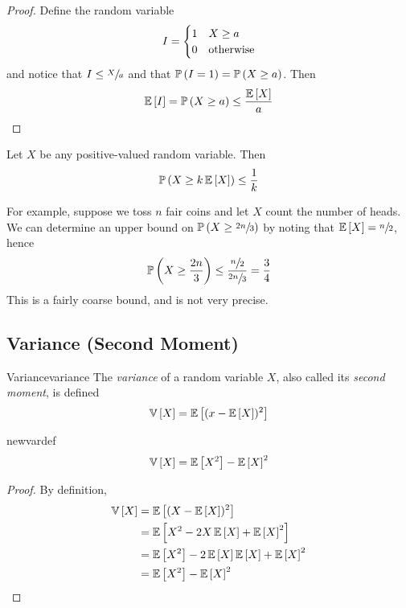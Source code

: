 \begin{proof}
    Define the random variable
    \[I = \begin{cases}
        1 & X \geq a\\
        0 & \hbox{otherwise}
    \end{cases}\]
    and notice that $I \leq \sfrac{X}{a}$ and that $\operatorname{\mathbb{P}}\left(I = 1\right) = \operatorname{\mathbb{P}}\left(X \geq
    a\right)$. Then
    \[\operatorname{\mathbb{E}}\left[I\right] = \operatorname{\mathbb{P}}\left(X \geq a\right) \leq \frac{\operatorname{\mathbb{E}}\left[X\right]}{a}\qedhere\]
\end{proof}

\begin{corollary}{}{}
    Let $X$ be any positive-valued random variable. Then
    \[\operatorname{\mathbb{P}}\left(X \geq k\operatorname{\mathbb{E}}\left[X\right]\right) \leq \frac{1}{k}\]
\end{corollary}

For example, suppose we toss $n$ fair coins and let $X$ count the number of
heads. We can determine an upper bound on $\operatorname{\mathbb{P}}\left(X \geq \sfrac{2n}{3}\right)$ by
noting that $\operatorname{\mathbb{E}}\left[X\right] = \sfrac{n}{2}$, hence
\[\operatorname{\mathbb{P}}\left(X \geq \frac{2n}{3}\right) \leq \frac{\sfrac{n}{2}}{\sfrac{2n}{3}} = \frac{3}{4}\]
This is a fairly coarse bound, and is not very precise.

\subsection{Variance (Second Moment)}
\begin{definition}{Variance}{variance}
    The \emph{variance} of a random variable $X$, also called its \emph{second
    moment}, is defined
    \[\operatorname{\mathbb{V}}\left[X\right] = \operatorname{\mathbb{E}}\left[(x - \operatorname{\mathbb{E}}\left[X\right])^2\right]\]
\end{definition}
\begin{theorem}{}{newvardef}
    \[\operatorname{\mathbb{V}}\left[X\right] = \operatorname{\mathbb{E}}\left[X^2\right] - \operatorname{\mathbb{E}}\left[X\right]^2\]
\end{theorem}
\begin{proof}
    By definition,
    \begin{align*}\operatorname{\mathbb{V}}\left[X\right]
        &= \operatorname{\mathbb{E}}\left[(X - \operatorname{\mathbb{E}}\left[X\right])^2\right]\\
        &= \operatorname{\mathbb{E}}\left[X^2 - 2X\operatorname{\mathbb{E}}\left[X\right] + \operatorname{\mathbb{E}}\left[X\right]^2\right]\\
        &= \operatorname{\mathbb{E}}\left[X^2\right] - 2\operatorname{\mathbb{E}}\left[X\right]\operatorname{\mathbb{E}}\left[X\right] + \operatorname{\mathbb{E}}\left[X\right]^2\\
        &= \operatorname{\mathbb{E}}\left[X^2\right] - \operatorname{\mathbb{E}}\left[X\right]^2\qedhere
    \end{align*}
\end{proof}

